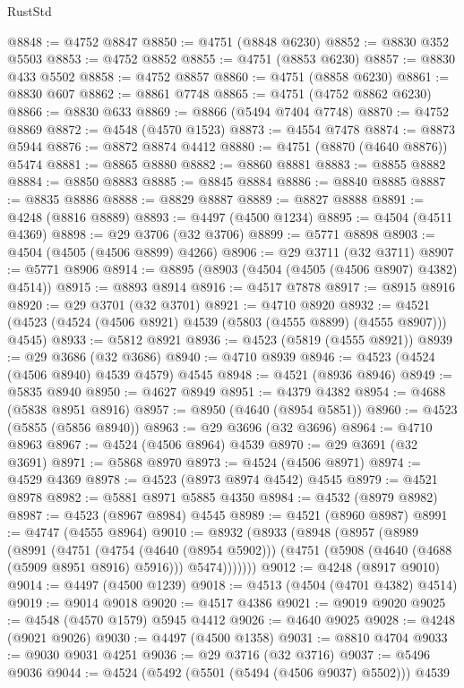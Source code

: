 \begin{lexlean}{RustStd}
\begin{coremodule}
@8848 := @4752 @8847
@8850 := @4751 (@8848 @6230)
@8852 := @8830 @352 @5503
@8853 := @4752 @8852
@8855 := @4751 (@8853 @6230)
@8857 := @8830 @433 @5502
@8858 := @4752 @8857
@8860 := @4751 (@8858 @6230)
@8861 := @8830 @607
@8862 := @8861 @7748
@8865 := @4751 (@4752 @8862 @6230)
@8866 := @8830 @633
@8869 := @8866 (@5494 @7404 @7748)
@8870 := @4752 @8869
@8872 := @4548 (@4570 @1523)
@8873 := @4554 @7478
@8874 := @8873 @5944
@8876 := @8872 @8874 @4412
@8880 := @4751 (@8870 (@4640 @8876)) @5474
@8881 := @8865 @8880
@8882 := @8860 @8881
@8883 := @8855 @8882
@8884 := @8850 @8883
@8885 := @8845 @8884
@8886 := @8840 @8885
@8887 := @8835 @8886
@8888 := @8829 @8887
@8889 := @8827 @8888
@8891 := @4248 (@8816 @8889)
@8893 := @4497 (@4500 @1234)
@8895 := @4504 (@4511 @4369)
@8898 := @29 @3706 (@32 @3706)
@8899 := @5771 @8898
@8903 := @4504 (@4505 (@4506 @8899) @4266)
@8906 := @29 @3711 (@32 @3711)
@8907 := @5771 @8906
@8914 := @8895 (@8903 (@4504 (@4505 (@4506 @8907) @4382) @4514))
@8915 := @8893 @8914
@8916 := @4517 @7878
@8917 := @8915 @8916
@8920 := @29 @3701 (@32 @3701)
@8921 := @4710 @8920
@8932 := @4521 (@4523 (@4524 (@4506 @8921) @4539 (@5803 (@4555 @8899) (@4555 @8907))) @4545)
@8933 := @5812 @8921
@8936 := @4523 (@5819 (@4555 @8921))
@8939 := @29 @3686 (@32 @3686)
@8940 := @4710 @8939
@8946 := @4523 (@4524 (@4506 @8940) @4539 @4579) @4545
@8948 := @4521 (@8936 @8946)
@8949 := @5835 @8940
@8950 := @4627 @8949
@8951 := @4379 @4382
@8954 := @4688 (@5838 @8951 @8916)
@8957 := @8950 (@4640 (@8954 @5851))
@8960 := @4523 (@5855 (@5856 @8940))
@8963 := @29 @3696 (@32 @3696)
@8964 := @4710 @8963
@8967 := @4524 (@4506 @8964) @4539
@8970 := @29 @3691 (@32 @3691)
@8971 := @5868 @8970
@8973 := @4524 (@4506 @8971)
@8974 := @4529 @4369
@8978 := @4523 (@8973 @8974 @4542) @4545
@8979 := @4521 @8978
@8982 := @5881 @8971 @5885 @4350
@8984 := @4532 (@8979 @8982)
@8987 := @4523 (@8967 @8984) @4545
@8989 := @4521 (@8960 @8987)
@8991 := @4747 (@4555 @8964)
@9010 := @8932
    (@8933
      (@8948
        (@8957
          (@8989
            (@8991
              (@4751
                (@4754 (@4640 (@8954 @5902)))
                (@4751 (@5908 (@4640 (@4688 (@5909 @8951 @8916) @5916))) @5474)))))))
@9012 := @4248 (@8917 @9010)
@9014 := @4497 (@4500 @1239)
@9018 := @4513 (@4504 (@4701 @4382) @4514)
@9019 := @9014 @9018
@9020 := @4517 @4386
@9021 := @9019 @9020
@9025 := @4548 (@4570 @1579) @5945 @4412
@9026 := @4640 @9025
@9028 := @4248 (@9021 @9026)
@9030 := @4497 (@4500 @1358)
@9031 := @8810 @4704
@9033 := @9030 @9031 @4251
@9036 := @29 @3716 (@32 @3716)
@9037 := @5496 @9036
@9044 := @4524 (@5492 (@5501 (@5494 (@4506 @9037) @5502))) @4539

\end{coremodule}
\end{lexlean}
